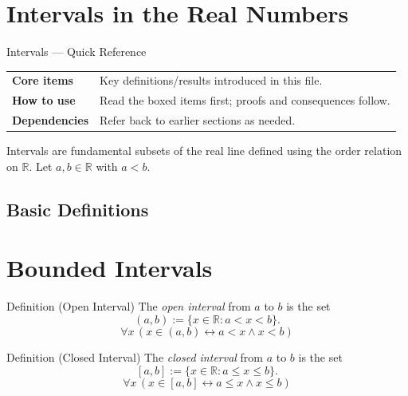 
\section{Intervals in the Real Numbers}

\begin{toolkitbox}{Intervals — Quick Reference}
\begin{tabular}{@{}p{}p{}@{}}
\textbf{Core items} & Key definitions/results introduced in this file.\\
\textbf{How to use} & Read the boxed items first; proofs and consequences follow.\\
\textbf{Dependencies} & Refer back to earlier sections as needed.\\
\end{tabular}
\end{toolkitbox}


\begin{exposition}
Intervals are fundamental subsets of the real line defined using the order
relation on $\mathbb{R}$. Let $a,b \in \mathbb{R}$ with $a < b$.
\end{exposition}

\subsection*{Basic Definitions}

\section*{Bounded Intervals}

\begin{definitionbox}{Definition (Open Interval)}
The \emph{open interval} from $a$ to $b$ is the set
\[
(a,b) := \{ x \in \mathbb{R} : a < x < b \}.
\]
\[
\forall x \, (x \in (a,b) \leftrightarrow a < x \wedge x < b)
\]
\end{definitionbox}
\label{def:open-interval-R}

\begin{definitionbox}{Definition (Closed Interval)}
The \emph{closed interval} from $a$ to $b$ is the set
\[
[a,b] := \{ x \in \mathbb{R} : a \le x \le b \}.
\]
\[
\forall x \, (x \in [a,b] \leftrightarrow a \le x \wedge x \le b)
\]
\end{definitionbox}
\label{def:closed-interval-R}

